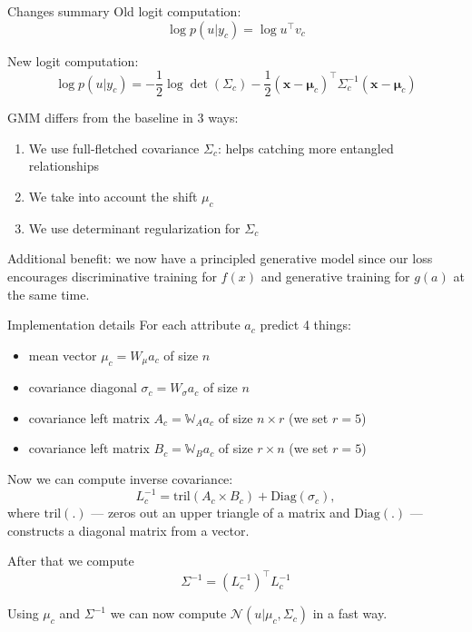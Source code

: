 \documentclass[10pt]{beamer}
\begin{document}
\begin{frame}{Changes summary}
\pause
Old logit computation:
\[
\log p(u|y_c) = \log u^\top v_c
\]

\pause
New logit computation:
\[
\log p(u|y_c) = -\frac{1}{2} \log \det(\Sigma_c) -\frac{1}{2}(\mathbf{x}-\boldsymbol{\mu}_c)^{\top} \Sigma_c^{-1}(\mathbf{x}-\boldsymbol{\mu}_c)
\]

\pause
GMM differs from the baseline in 3 ways:
    \begin{enumerate}
        \item We use full-fletched covariance $\Sigma_c$: helps catching more entangled relationships
        \item We take into account the shift $\mu_c$
        \item We use determinant regularization for $\Sigma_c$
    \end{enumerate}

\pause
Additional benefit: we now have a principled generative model since our loss encourages discriminative training for $f(x)$ and generative training for $g(a)$ at the same time.
\end{frame}

\begin{frame}{Implementation details}
\pause
For each attribute $a_c$ predict 4 things:
    \begin{itemize}
        \item mean vector $\mu_c = W_\mu a_c$ of size $n$
        \item covariance diagonal $\sigma_c = W_\sigma a_c$ of size $n$
        \item covariance left matrix $A_c = \mathbb{W}_A a_c$ of size $n\times r$ (we set $r = 5$)
        \item covariance left matrix $B_c = \mathbb{W}_B a_c$ of size $r\times n$ (we set $r = 5$)
    \end{itemize}

\pause
Now we can compute inverse covariance:
\[
L_c^{-1} = \text{tril}(A_c \times B_c) + \text{Diag}(\sigma_c),
\]
where $\text{tril}(.)$ --- zeros out an upper triangle of a matrix and $\text{Diag}(.)$ --- constructs a diagonal matrix from a vector.

\pause
After that we compute 
\[
\Sigma^{-1} = (L_c^{-1})^\top L_c^{-1}
\]

\pause
Using $\mu_c$ and $\Sigma^{-1}$ we can now compute $\mathcal{N}(u | \mu_c, \Sigma_c)$ in a fast way.
    
\end{frame}
\end{document}
